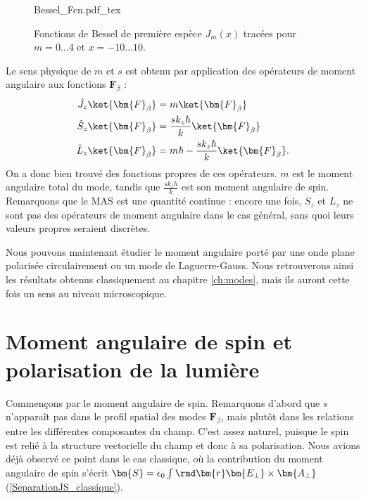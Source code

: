 \begin{figure}[!ht]
\centering
\def\svgwidth{0.8\columnwidth}
{Bessel_Fcn.pdf_tex}
\caption{Fonctions de Bessel de première espèce $J_m(x)$ tracées pour $m=0\ldots4$ et $x=-10\ldots10$.}
\label{Fig:BesselFcn}
\end{figure}

Le sens physique de $m$ et $s$ est obtenu par application des opérateurs de moment angulaire aux fonctions $\bm{F}_{\beta}$ :
\begin{equation}
\begin{alignedat}{1}
\hat{J}_z\ket{\bm{F}_{\beta}} &= m\ket{\bm{F}_{\beta}}\\
\hat{S}_z\ket{\bm{F}_{\beta}} &= \frac{sk_z\hbar}{k}\ket{\bm{F}_{\beta}}\\
\hat{L}_z\ket{\bm{F}_{\beta}} &= m\hbar-\frac{sk_z\hbar}{k}\ket{\bm{F}_{\beta}}.
\end{alignedat}
\label{eq.VP_AM}
\end{equation}
On a donc bien trouvé des fonctions propres de ces opérateurs. $m$ est le moment angulaire total du mode, tandis que $\frac{sk_z\hbar}{k}$ est son moment angulaire de spin. Remarquons que le MAS est une quantité continue : encore une fois, $S_z$ et $L_z$ ne sont pas des opérateurs de moment angulaire dans le cas général, sans quoi leurs valeurs propres seraient discrètes. \par
Nous pouvons maintenant étudier le moment angulaire porté par une onde plane polarisée circulairement ou un mode de Laguerre-Gauss. Nous retrouverons ainsi les résultats obtenus classiquement au chapitre \ref{ch:modes}, mais ils auront cette fois un sens au niveau microscopique.

\section{Moment angulaire de spin et polarisation de la lumière}
Commençons par le moment angulaire de spin. Remarquons d'abord que $s$ n'apparaît pas dans le profil spatial des modes $\bm{F}_{\beta}$, mais plutôt dans les relations entre les différentes composantes du champ. C'est assez naturel, puisque le spin est relié à la structure vectorielle du champ et donc à sa polarisation. Nous avions déjà observé ce point dans le cas classique, où la contribution du moment angulaire de spin s'écrit $\bm{S}=\epsilon_0\int{\rmd\bm{r}\bm{E_{\bot}}\times\bm{A_{\bot}}}$ (\ref{SeparationJS_classique}).

